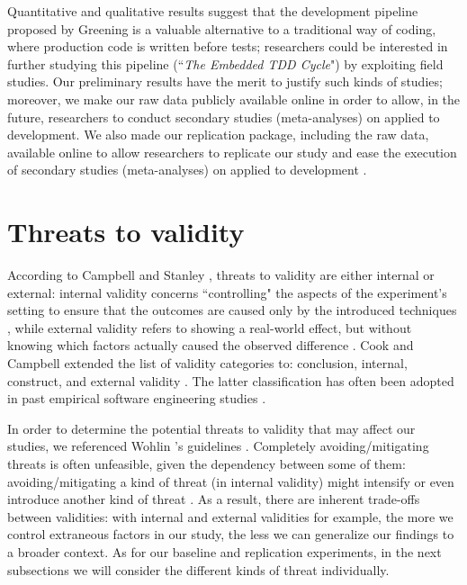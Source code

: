 Quantitative and qualitative results suggest that the development pipeline proposed by Greening\cite{TDDEC} is a valuable alternative to a traditional way of coding, where production code is written before tests; researchers could be interested in further studying this pipeline (\ie ``\textit{The Embedded TDD Cycle}") by exploiting field studies. 
Our preliminary results have the merit to justify such kinds of studies; moreover, we make our raw data publicly available online in order to allow, in the future, researchers to conduct secondary studies (\eg meta-analyses) on \tdd applied to \ess development.
We also made our replication package, including the raw data, available online to allow researchers to replicate our study and ease the execution of secondary studies (\eg meta-analyses) on \tdd applied to \ess development \cite{RepPackage}.

\section{Threats to validity}
According to Campbell and Stanley \cite{ResearchOfTeaching}, threats to validity are either internal or external: internal validity concerns ``controlling" the aspects of the experiment's setting to ensure that the outcomes are caused only by the introduced techniques \cite{DBLP:conf/icse/SiegmundSA15}, while external validity refers to showing a real-world effect, but without knowing which factors actually caused the observed difference \cite{DBLP:conf/icse/SiegmundSA15}.
Cook and Campbell extended the list of validity categories to: conclusion, internal, construct, and external validity \cite{QuasiExp}. The latter classification has often been adopted in past empirical software engineering studies \cite{DBLP:books/sp/WohlinRHOR00}. 

In order to determine the potential threats to validity that may affect our studies, we referenced Wohlin \etal's guidelines \cite{DBLP:books/sp/WohlinRHOR00}.
Completely avoiding/mitigating threats is often unfeasible, given the dependency between some of them: avoiding/mitigating a kind of threat (\ie in internal validity) might intensify or even introduce another kind of threat \cite{DBLP:books/sp/WohlinRHOR00}. As a result, there are inherent trade-offs between validities: with internal and external validities for example, the more we control extraneous factors in our study, the less we can generalize our findings to a broader context. As for our baseline and replication experiments, in the next subsections we will consider the different kinds of threat individually.

